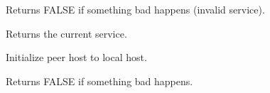
Returns FALSE if something bad happens (invalid service).

%
%



Returns the current service.

%
%



Initialize peer host to local host.


Returns FALSE if something bad happens.

